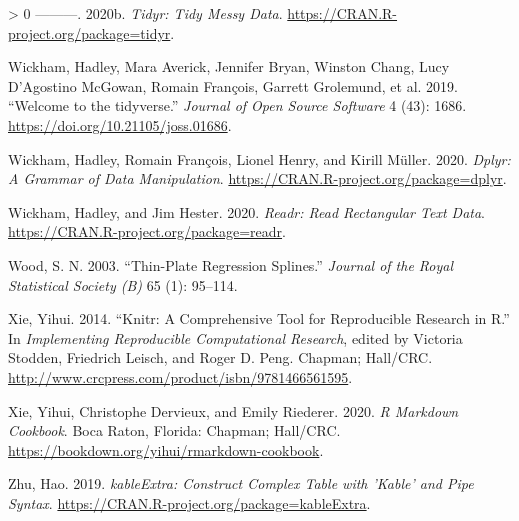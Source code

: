 \documentclass[12pt]{article}
\newlength{\cslhangindent}
\newenvironment{CSLReferences}[3] %
 {%
  \setlength{\parindent}{0pt}
  \ifodd #1 \everypar{\setlength{\hangindent}{\cslhangindent}}\ignorespaces\fi
  \ifnum #2 > 0
  \setlength{\parskip}{#2\baselineskip}
  \fi
 }%
 {}
\begin{document}
\begin{CSLReferences}{1}{0}
\leavevmode\hypertarget{ref-tidyr}{}%
---------. 2020b. \emph{Tidyr: Tidy Messy Data}. \url{https://CRAN.R-project.org/package=tidyr}.

\leavevmode\hypertarget{ref-tidyverse}{}%
Wickham, Hadley, Mara Averick, Jennifer Bryan, Winston Chang, Lucy D'Agostino McGowan, Romain François, Garrett Grolemund, et al. 2019. {``Welcome to the {tidyverse}.''} \emph{Journal of Open Source Software} 4 (43): 1686. \url{https://doi.org/10.21105/joss.01686}.

\leavevmode\hypertarget{ref-dplyr}{}%
Wickham, Hadley, Romain François, Lionel Henry, and Kirill Müller. 2020. \emph{Dplyr: A Grammar of Data Manipulation}. \url{https://CRAN.R-project.org/package=dplyr}.

\leavevmode\hypertarget{ref-readr}{}%
Wickham, Hadley, and Jim Hester. 2020. \emph{Readr: Read Rectangular Text Data}. \url{https://CRAN.R-project.org/package=readr}.

\leavevmode\hypertarget{ref-mgcv}{}%
Wood, S. N. 2003. {``Thin-Plate Regression Splines.''} \emph{Journal of the Royal Statistical Society (B)} 65 (1): 95--114.

\leavevmode\hypertarget{ref-knitr}{}%
Xie, Yihui. 2014. {``Knitr: A Comprehensive Tool for Reproducible Research in {R}.''} In \emph{Implementing Reproducible Computational Research}, edited by Victoria Stodden, Friedrich Leisch, and Roger D. Peng. Chapman; Hall/CRC. \url{http://www.crcpress.com/product/isbn/9781466561595}.

\leavevmode\hypertarget{ref-rmarkdown}{}%
Xie, Yihui, Christophe Dervieux, and Emily Riederer. 2020. \emph{R Markdown Cookbook}. Boca Raton, Florida: Chapman; Hall/CRC. \url{https://bookdown.org/yihui/rmarkdown-cookbook}.

\leavevmode\hypertarget{ref-kableExtra}{}%
Zhu, Hao. 2019. \emph{kableExtra: Construct Complex Table with 'Kable' and Pipe Syntax}. \url{https://CRAN.R-project.org/package=kableExtra}.

\end{CSLReferences}



\end{document}
